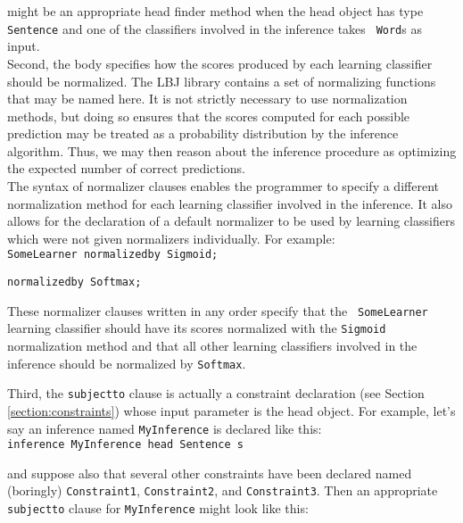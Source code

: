 \noindent
might be an appropriate head finder method when the head object has type {\tt
Sentence} and one of the classifiers involved in the inference takes {\tt
Word}s as input. \\

Second, the body specifies how the scores produced by each learning classifier
should be normalized.  The LBJ library contains a set of normalizing functions
that may be named here.  It is not strictly necessary to use normalization
methods, but doing so ensures that the scores computed for each possible
prediction may be treated as a probability distribution by the inference
algorithm.  Thus, we may then reason about the inference procedure as
optimizing the expected number of correct predictions. \\

The syntax of normalizer clauses enables the programmer to specify a different
normalization method for each learning classifier involved in the inference.
It also allows for the declaration of a default normalizer to be used
by learning classifiers which were not given normalizers individually.  For
example: \\

\vspace{-.25cm}
{\tt SomeLearner normalizedby Sigmoid;}

{\tt normalizedby Softmax;} \\
\vspace{-.25cm}

\noindent
These normalizer clauses written in any order specify that the {\tt
SomeLearner} learning classifier should have its scores normalized with the
{\tt Sigmoid} normalization method and that all other learning classifiers
involved in the inference should be normalized by {\tt Softmax}.

Third, the {\tt subjectto} clause is actually a constraint declaration
(see Section \ref{section:constraints}) whose input parameter is the head
object.  For example, let's say an inference named {\tt MyInference} is
declared like this: \\

\vspace{-.25cm}
{\tt inference MyInference head Sentence s} \\
\vspace{-.25cm}

\noindent
and suppose also that several other constraints have been declared named
(boringly) {\tt Constraint1}, {\tt Constraint2}, and {\tt Constraint3}.
Then an appropriate {\tt subjectto} clause for {\tt MyInference} might look
like this: \\

